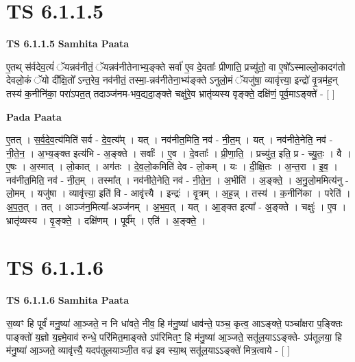 \documentclass[17pt]{extarticle}
\begin{document}

\section{ TS 6.1.1.5 }

\textbf{TS 6.1.1.5 } \newline
\textbf{Samhita Paata} \newline

ए॒तथ् स॑र्वदेव॒त्यं॑ ॅयन्नव॑नीतं॒ ॅयन्नव॑नीतेनाभ्य॒ङ्क्ते सर्वा॑ ए॒व दे॒वताः᳚ प्रीणाति॒ प्रच्यु॑तो॒ वा ए॒षो᳚ऽस्माल्लो॒कादग॑तो देवलो॒कं ॅयो दी᳚क्षि॒तो᳚ ऽन्त॒रेव॒ नव॑नीतं॒ तस्मा॒-न्नव॑नीतेना॒भ्य॑ङ्क्ते ऽनुलो॒मं ॅयजु॑षा॒ व्यावृ॑त्त्या॒ इन्द्रो॑ वृ॒त्रम॑ह॒न् तस्य॑ क॒नीनि॑का॒ परा॑ऽपत॒त् तदाञ्ज॑नम-भव॒द्यदा॒ङ्क्ते चक्षु॑रे॒व भ्रातृ॑व्यस्य वृङ्क्ते॒ दक्षि॑णं॒ पूर्व॒माऽङ्क्ते॑ - [  ] \newline

\textbf{Pada Paata} \newline

ए॒तत् । स॒र्व॒दे॒व॒त्य॑मिति॑ सर्व - दे॒व॒त्य᳚म् । यत् । नव॑नीत॒मिति॒ नव॑ - नी॒त॒म् । यत् । नव॑नीते॒नेति॒ नव॑ - नी॒ते॒न॒ । अ॒भ्य॒ङ्क्त इत्य॑भि - अ॒ङ्क्ते । सर्वाः᳚ । ए॒व । दे॒वताः᳚ । प्री॒णा॒ति॒ । प्रच्यु॑त॒ इति॒ प्र - च्यु॒तः॒ । वै । ए॒षः । अ॒स्मात् । लो॒कात् । अग॑तः । दे॒व॒लो॒कमिति॑ देव - लो॒कम् । यः । दी॒क्षि॒तः । अ॒न्त॒रा । इ॒व॒ । नव॑नीत॒मिति॒ नव॑ - नी॒त॒म् । तस्मा᳚त् । नव॑नीते॒नेति॒ नव॑ - नी॒ते॒न॒ । अ॒भीति॑ । अ॒ङ्क्ते॒ । अ॒नु॒लो॒ममित्य॑नु - लो॒मम् । यजु॑षा । व्यावृ॑त्त्या॒ इति॑ वि - आवृ॑त्त्यै । इन्द्रः॑ । वृ॒त्रम् । अ॒ह॒न्न् । तस्य॑ । क॒नीनि॑का । परेति॑ । अ॒प॒त॒त् । तत् । आञ्ज॑न॒मित्या᳚-अञ्ज॑नम् । अ॒भ॒व॒त् । यत् । आ॒ङ्क्त इत्या᳚ - अ॒ङ्क्ते । चक्षुः॑ । ए॒व । भ्रातृ॑व्यस्य । वृ॒ङ्क्ते॒ । दक्षि॑णम् । पूर्व᳚म् । एति॑ । अ॒ङ्क्ते॒ ।  \newline





\section{ TS 6.1.1.6 }

\textbf{TS 6.1.1.6 } \newline
\textbf{Samhita Paata} \newline

स॒व्यꣳ हि पूर्वं॑ मनु॒ष्या॑ आ॒ञ्जते॒ न नि धा॑वते॒ नीव॒ हि म॑नु॒ष्या॑ धाव॑न्ते॒ पञ्च॒ कृत्व॒ आऽङ्क्ते॒ पञ्चा᳚क्षरा प॒ङ्क्तिः पाङ्क्तो॑ य॒ज्ञो य॒ज्ञ्मे॒वाव॑ रुन्धे॒ परि॑मित॒माङ्क्ते ऽप॑रिमितꣳ॒॒ हि म॑नु॒ष्या॑ आ॒ञ्जते॒ सतू॑ल॒याऽऽङ्क्ते- ऽप॑तूलया॒ हि म॑नु॒ष्या॑ आ॒ञ्जते॒ व्यावृ॑त्त्यै॒ यदप॑तूलयाञ्जी॒त वज्र॑ इव स्या॒थ् सतू॑ल॒याऽऽङ्क्ते॑ मित्र॒त्वाये - [  ] \newline
\end{document}
